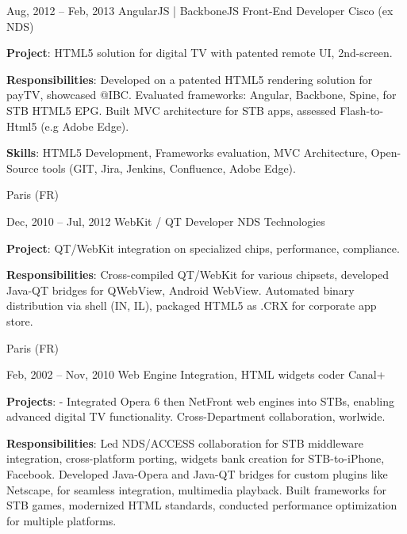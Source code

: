 \documentclass[
  a4paper,
   maincolor=cvblue,
   sectioncolor=cvblue,
   sidebarwidth=0.323\paperwidth,
]{fortysecondscv}
\begin{document}
\begin{cvtableNew}
  \cvitemRightNew
    {Aug, 2012 – Feb, 2013} %
    {AngularJS | BackboneJS Front-End Developer} %
    {Cisco (ex NDS)} %
    {
      \vspace{1pt}
      \fontsize{10.8pt}{12pt}\selectfont %
      \textbf{Project}: HTML5 solution for digital TV with patented remote UI, 2nd-screen.\par
      \vspace{4pt}
      \textbf{Responsibilities}: Developed on a patented HTML5 rendering solution for payTV, showcased @IBC. Evaluated frameworks: Angular, Backbone, Spine, for STB HTML5 EPG. Built MVC architecture for STB apps, assessed Flash-to-Html5 (e.g Adobe Edge).\par
      \vspace{4pt}
      \textbf{Skills}: HTML5 Development, Frameworks evaluation, MVC Architecture, Open-Source tools (GIT, Jira, Jenkins, Confluence, Adobe Edge).\par
    }
    {Paris (FR)} %

  \vspace{1.48mm} %

  \cvitemRightNew
    {Dec, 2010 – Jul, 2012} %
    {WebKit / QT Developer} %
    {NDS Technologies} %
    {
      \vspace{1pt}
      \fontsize{10.8pt}{12pt}\selectfont %
      \textbf{Project}: QT/WebKit integration on specialized chips, performance, compliance.\par
      \vspace{4pt}
      \textbf{Responsibilities}: Cross-compiled QT/WebKit for various chipsets, developed Java-QT bridges for {QWebView, Android WebView}. Automated binary distribution via shell (IN, IL), packaged HTML5 as .CRX for corporate app store.\par
    }
    {Paris (FR)} %

  \vspace{1.48mm} %

  \cvitemRightNew
  {Feb, 2002 – Nov, 2010} %
  {Web Engine Integration, HTML widgets coder} %
  {Canal+} %
  {
    \vspace{1pt}
    \fontsize{10.8pt}{12pt}\selectfont %
    \textbf{Projects}:
    - Integrated Opera 6 then NetFront web engines into STBs, enabling advanced digital TV functionality. Cross-Department collaboration, worlwide. \par
    \vspace{4pt}
    \textbf{Responsibilities}:
    Led NDS/ACCESS collaboration for STB middleware integration,
    cross-platform porting, widgets bank creation for STB-to-iPhone, Facebook.
    Developed Java-Opera and Java-QT bridges for custom plugins like Netscape, for seamless integration, multimedia playback.
    Built frameworks for STB games, modernized HTML standards, conducted performance optimization for multiple platforms.

}
\end{cvtableNew}
\end{document}
